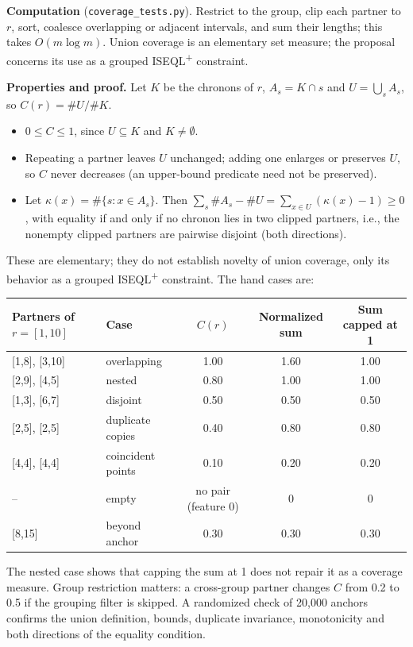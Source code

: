 \documentclass[10pt]{article}
\newcommand{\iseql}{ISEQL\textsuperscript{+}}
\newcommand{\tf}[1]{\texttt{#1}}
\begin{document}
\textbf{Computation} (\tf{coverage\_tests.py}). Restrict to the group, clip each partner to $r$, sort, coalesce overlapping or adjacent intervals, and sum their lengths; this takes $O(m\log m)$. Union coverage is an elementary set measure; the proposal concerns its use as a grouped \iseql{} constraint.

\textbf{Properties and proof.} Let $K$ be the chronons of $r$, $A_s=K\cap s$ and $U=\bigcup_s A_s$, so $C(r)=\#U/\#K$.
\begin{itemize}
\item $0\le C\le1$, since $U\subseteq K$ and $K\neq\emptyset$.
\item Repeating a partner leaves $U$ unchanged; adding one enlarges or preserves $U$, so $C$ never decreases (an upper-bound predicate need not be preserved).
\item Let $\kappa(x)=\#\{s: x\in A_s\}$. Then $\sum_s\#A_s-\#U=\sum_{x\in U}(\kappa(x)-1)\ge 0$, with equality if and only if no chronon lies in two clipped partners, i.e., the nonempty clipped partners are pairwise disjoint (both directions).
\end{itemize}
These are elementary; they do not establish novelty of union coverage, only its behavior as a grouped \iseql{} constraint.
The hand cases are:

\begin{center}\footnotesize
\begin{tabular}{@{}llccc@{}}
\toprule
Partners of $r=[1,10]$ & Case & $C(r)$ & Normalized sum & Sum capped at 1 \\
\midrule
{}[1,8], [3,10] & overlapping & 1.00 & 1.60 & 1.00 \\
{}[2,9], [4,5] & nested & 0.80 & 1.00 & 1.00 \\
{}[1,3], [6,7] & disjoint & 0.50 & 0.50 & 0.50 \\
{}[2,5], [2,5] & duplicate copies & 0.40 & 0.80 & 0.80 \\
{}[4,4], [4,4] & coincident points & 0.10 & 0.20 & 0.20 \\
-- & empty & no pair (feature 0) & 0 & 0 \\
{}[8,15] & beyond anchor & 0.30 & 0.30 & 0.30 \\
\bottomrule
\end{tabular}\end{center}
The nested case shows that capping the sum at 1 does not repair it as a coverage measure. Group restriction matters: a cross-group partner changes $C$ from 0.2 to 0.5 if the grouping filter is skipped. A randomized check of 20,000 anchors confirms the union definition, bounds, duplicate invariance, monotonicity and both directions of the equality condition.
\end{document}

